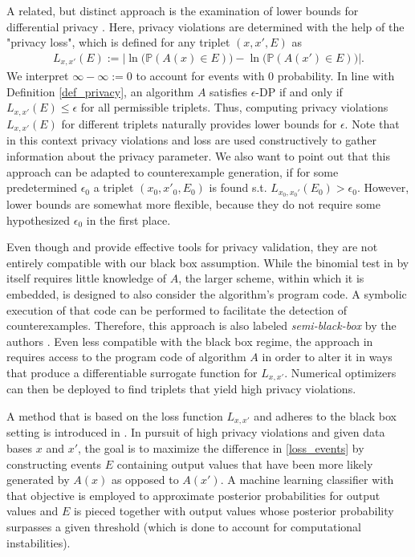 \documentclass[conference]{IEEEtran}
\begin{document}
A related, but distinct approach is the examination of lower bounds for differential privacy \cite{DP-Finder}. Here, privacy violations are determined with the help of the "privacy loss", which is defined for any triplet $(x,x',E)$ as
\begin{align}
L_{x,x'}(E) := \Big| \ln \big( \mathbb{P}(A(x) \in E ) \big) - \ln \big( \mathbb{P}(A(x') \in E ) \big) \Big| \label{loss_events}.
\end{align}
We interpret $\infty-\infty := 0$ to account for events with $0$ probability.
In line with Definition \ref{def_privacy}, an algorithm $A$ satisfies $\epsilon$-DP if and only if $L_{x,x'}(E)\le \epsilon$ for all permissible triplets. Thus, computing privacy violations $L_{x,x'}(E)$ for different triplets naturally provides lower bounds for $\epsilon$. Note that in this context privacy violations and loss are used constructively to gather information about the privacy parameter. We also want to point out that this approach can be adapted to counterexample generation, if for some predetermined $\epsilon_0$ a triplet  $(x_0,x'_0,E_0)$ is found s.t. $L_{x_0,x_0'}(E_0)>\epsilon_0$. However, lower bounds are somewhat more flexible, because they do not require some hypothesized $\epsilon_0$ in the first place.  

Even though \cite{StatDP} and \cite{DP-Finder} provide effective tools for privacy validation, they are not entirely compatible with our black box assumption. While the binomial test in \cite{StatDP} by itself requires little knowledge of $A$, the larger scheme, within which it is embedded, is designed to also consider the algorithm's program code. A symbolic execution of that code can be performed to  facilitate the detection of counterexamples. Therefore, this approach is also labeled  \textit{semi-black-box} by the authors \cite{StatDP}. Even less compatible with the black box regime, the approach in \cite{DP-Finder} requires access to the program code of algorithm $A$ in order to alter it in ways that produce a differentiable surrogate function for $L_{x,x'}$. Numerical optimizers can then be deployed to find triplets that yield high privacy violations.



A method that is based on the loss function $L_{x,x'}$ and adheres to the black box setting is introduced in \cite{DP-Sniper}. In pursuit of high privacy violations and given data bases $x$ and $x'$, the goal is to maximize the difference in \eqref{loss_events} by constructing events $E$  containing output values that have been more likely generated by $A(x)$ as opposed to $A(x')$. A machine learning classifier with that objective is employed to approximate posterior probabilities for output values and $E$ is pieced together with output values whose posterior probability surpasses a given threshold (which is done to account for computational instabilities).
\end{document}
